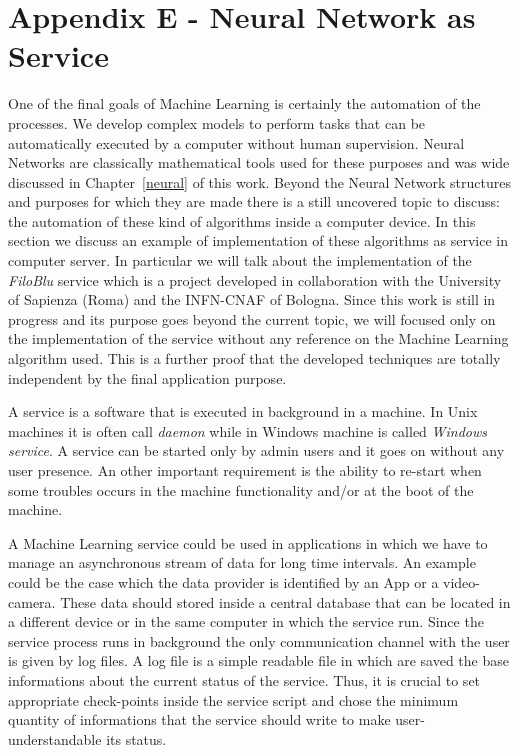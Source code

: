 \documentclass{standalone}
\begin{document}
\chapter*{Appendix E - Neural Network as Service}

One of the final goals of Machine Learning is certainly the automation of the processes.
We develop complex models to perform tasks that can be automatically executed by a computer without human supervision.
Neural Networks are classically mathematical tools used for these purposes and was wide discussed in Chapter~\ref{neural} of this work.
Beyond the Neural Network structures and purposes for which they are made there is a still uncovered topic to discuss: the automation of these kind of algorithms inside a computer device.
In this section we discuss an example of implementation of these algorithms as service in computer server.
In particular we will talk about the implementation of the \emph{FiloBlu} service which is a project developed in collaboration with the University of Sapienza (Roma) and the INFN-CNAF of Bologna.
Since this work is still in progress and its purpose goes beyond the current topic, we will focused only on the implementation of the service without any reference on the Machine Learning algorithm used.
This is a further proof that the developed techniques are totally independent by the final application purpose.

A service is a software that is executed in background in a machine.
In Unix machines it is often call \emph{daemon} while in Windows machine is called \emph{Windows service}.
A service can be started only by admin users and it goes on without any user presence.
An other important requirement is the ability to re-start when some troubles occurs in the machine functionality and/or at the boot of the machine.

A Machine Learning service could be used in applications in which we have to manage an asynchronous stream of data for long time intervals.
An example could be the case which the data provider is identified by an App or a video-camera.
These data should stored inside a central database that can be located in a different device or in the same computer in which the service run.
Since the service process runs in background the only communication channel with the user is given by log files.
A log file is a simple readable file in which are saved the base informations about the current status of the service.
Thus, it is crucial to set appropriate check-points inside the service script and chose the minimum quantity of informations that the service should write to make user-understandable its status.
\end{document}
